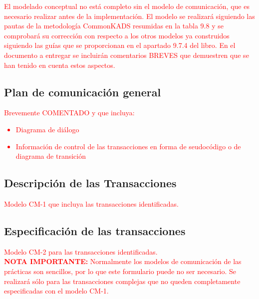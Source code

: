 \documentclass[12pt,a4paper,twoside,spanish]{article}      %
\begin{document}
\textcolor {red} {El modelado conceptual no está completo sin el modelo de comunicación, que es necesario realizar antes de la implementación. El modelo se realizará siguiendo las pautas de la metodología CommonKADS resumidas en la tabla 9.8 y se comprobará su corrección con respecto a los otros modelos ya construidos siguiendo las guías que se proporcionan en el apartado 9.7.4 del libro. En el documento a entregar se incluirán comentarios BREVES que demuestren que se han tenido en cuenta estos aspectos.}

\subsection{Plan de comunicación general}

\textcolor {red}
{
Brevemente COMENTADO y que incluya:
\begin{itemize}
 \item Diagrama de diálogo
 \item Información de control de las transacciones en forma de
seudocódigo o de diagrama de transición
\end{itemize}
}

\subsection{Descripción de las Transacciones}
\textcolor {red} {Modelo CM-1 que incluya las transacciones identificadas.}


\subsection{Especificación de las transacciones}

\textcolor {red} {
Modelo CM-2 para las transacciones identificadas.
\\
\textbf{NOTA IMPORTANTE:} Normalmente los modelos de comunicación de las prácticas son sencillos, por lo que este formulario puede no ser necesario. Se realizará sólo
para las transacciones complejas que no queden completamente
especificadas con el modelo CM-1.
}

\end{document}
